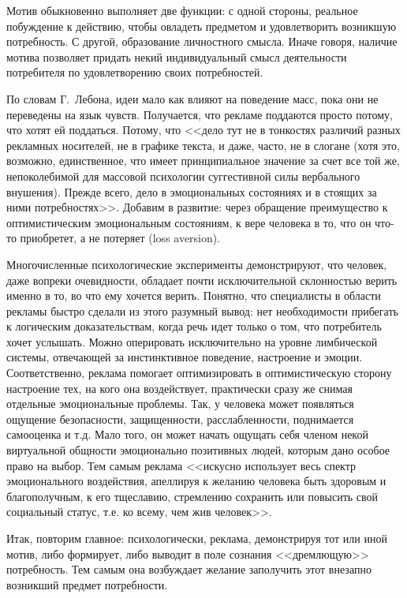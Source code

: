 Мотив обыкновенно выполняет две функции: с одной стороны, реальное побуждение
к действию, чтобы овладеть предметом и удовлетворить возникшую потребность.
С другой, образование личностного смысла. Иначе говоря, наличие мотива
позволяет придать некий индивидуальный смысл деятельности потребителя по
удовлетворению своих потребностей.

По словам Г.~Лебона, идеи мало как влияют на поведение масс, пока они не переведены
на язык чувств. Получается, что рекламе поддаются просто потому, что хотят
ей поддаться. Потому, что <<дело тут не в тонкостях различий разных рекламных
носителей, не в графике текста, и даже, часто, не в слогане (хотя это,
возможно, единственное, что имеет принципиальное значение за счет все той же,
непоколебимой для массовой психологии суггестивной силы вербального внушения).
Прежде всего, дело в эмоциональных состояниях и в стоящих за ними потребностях>>.\autocite[][315]{olshansky}
Добавим в развитие: через обращение преимущество к оптимистическим эмоциональным
состояниям, к вере человека в то, что он что-то приобретет, а не потеряет
(loss aversion).

Многочисленные психологические эксперименты демонстрируют, что человек,
даже вопреки очевидности, обладает почти исключительной склонностью верить
именно в то, во что ему хочется верить. Понятно, что специалисты в области
рекламы быстро сделали из этого разумный вывод: нет необходимости прибегать
к логическим доказательствам, когда речь идет только о том, что потребитель
хочет услышать. Можно оперировать исключительно на уровне лимбической системы,
отвечающей за инстинктивное поведение, настроение и эмоции. Соответственно,
реклама помогает оптимизировать в оптимистическую сторону настроение тех,
на кого она воздействует, практически сразу же снимая отдельные эмоциональные
проблемы. Так, у человека может появляться ощущение безопасности, защищенности,
расслабленности, поднимается самооценка и т.д. Мало того, он может начать
ощущать себя членом некой виртуальной общности эмоционально позитивных людей,
которым дано особое право на выбор.
\autocite{ariely2009predictably}\autocite{dittrich2008upside}\autocite{martin2012}\autocite{lindstrom2010}
Тем самым реклама <<искусно использует весь спектр эмоционального воздействия,
апеллируя к желанию человека быть здоровым и благополучным, к его тщеславию,
стремлению сохранить или повысить свой социальный статус, т.е. ко всему, чем
жив человек>>.\autocite{feofanov1987}

Итак, повторим главное: психологически, реклама, демонстрируя тот или иной мотив,
либо формирует, либо выводит в поле сознания <<дремлющую>> потребность.
Тем самым она возбуждает желание заполучить этот внезапно возникший предмет
потребности.

